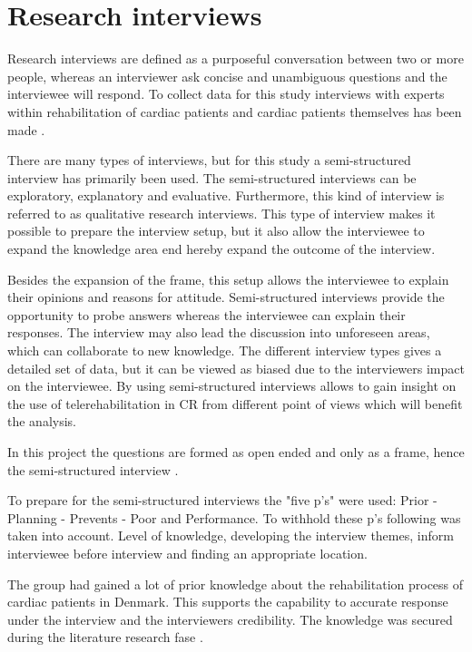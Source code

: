 \section{Research interviews}
\label{qualitative}

Research interviews are defined as a purposeful conversation between two or more people, whereas an interviewer ask concise and unambiguous questions and the interviewee will respond. To collect data for this study interviews with experts within rehabilitation of cardiac patients and cardiac patients themselves has been made \cite{mark2009research}. 

There are many types of interviews, but for this study a semi-structured interview has primarily been used. The semi-structured interviews can be exploratory, explanatory and evaluative. Furthermore, this kind of interview is referred to as qualitative research interviews. This type of interview makes it possible to prepare the interview setup, but it also allow the interviewee to expand the knowledge area end hereby expand the outcome of the interview. 

Besides the expansion of the frame, this setup allows the interviewee to explain their opinions and reasons for attitude. Semi-structured interviews provide the opportunity to probe answers whereas the interviewee can explain their responses. The interview may also lead the discussion into unforeseen areas, which can collaborate to new knowledge. The different interview types gives a detailed set of data, but it can be viewed as biased due to the interviewers impact on the interviewee. By using semi-structured interviews allows to gain insight on the use of telerehabilitation in CR from different point of views which will benefit the analysis.

In this project the questions are formed as open ended and only as a frame, hence the semi-structured interview \cite{mark2009research}.

To prepare for the semi-structured interviews the "five p's" were used: Prior - Planning - Prevents - Poor and Performance. To withhold these p's following was taken into account. Level of knowledge, developing the interview themes, inform interviewee before interview and finding an appropriate location. 

The group had gained a lot of prior knowledge about the rehabilitation process of cardiac patients in Denmark. This supports the capability to accurate response under the interview and the interviewers credibility. The knowledge was secured during the literature research fase \cite{mark2009research}. 

